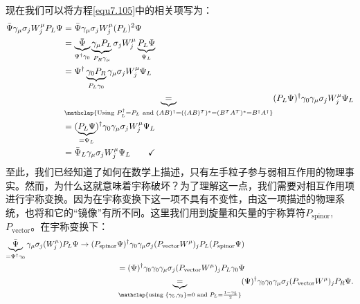 现在我们可以将方程\ref{equ7.105}中的相关项写为：
\begin{align}
\bar{\Psi}\gamma_\mu\sigma_j W_j^\mu P_L\Psi&=\bar{\Psi}\gamma_\mu\sigma_j W_j^\mu (P_L)^2\Psi\nonumber\\
&=\underbrace{\bar{\Psi}}_{\Psi^\dag\gamma_0}\underbrace{\gamma_\mu P_L}_{P_R\gamma_\mu}\sigma_j W_j^\mu \underbrace{P_L\Psi}_{\Psi_L}\nonumber\\
&=\Psi^\dag\underbrace{\gamma_0P_R}_{P_L\gamma_0}\gamma_\mu\sigma_j W_j^\mu \Psi_L\nonumber\\
&\underbrace{=}_{\mathclap{\text{Using }P_L^\dag=P_L\text{ and }(AB)^\dag=((AB)^T)^*=(B^TA^T)^*=B^\dag A^\dag}}(P_L\Psi)^\dag\gamma_0\gamma_\mu\sigma_j W_j^\mu \Psi_L\nonumber\\
&=(\underbrace{P_L\Psi}_{=\Psi_L})^\dag\gamma_0\gamma_\mu\sigma_j W_j^\mu \Psi_L\nonumber\\
&=\bar{\Psi}_L\gamma_\mu\sigma_j W_j^\mu \Psi_L\text{\hspace{7mm}\checkmark}
\label{equ7.108}
\end{align}
至此，我们已经知道了如何在数学上描述，只有左手粒子参与弱相互作用的物理事实。然而，为什么这就意味着宇称破坏？为了理解这一点，我们需要对相互作用项进行宇称变换。因为在宇称变换下这一项不具有不变性，由这一项描述的物理系统，也将和它的“镜像”有所不同。这里我们用到旋量和矢量的宇称算符$P_\text{spinor}$, $P_\text{vector}$。在宇称变换下：
\begin{align}
\underbrace{\bar{\Psi}}_{=\Psi^\dag\gamma_0}\gamma_\mu\sigma_j (W_j^\mu) P_L\Psi\rightarrow(P_\text{spinor}&\Psi)^\dag\gamma_0\gamma_\mu\sigma_j (P_\text{vector}W^\mu)_j P_L(P_\text{spinor}\Psi)\nonumber\\
&=(\Psi)^\dag\gamma_0\gamma_0\gamma_\mu\sigma_j (P_\text{vector}W^\mu)_j P_L\gamma_0\Psi\nonumber\\
&\underbrace{=}_{\mathclap{\text{using }\{\gamma_5,\gamma_0\}=0\text{ and }P_L=\frac{1-\gamma_5}{2}}}(\Psi)^\dag\gamma_0\gamma_0\gamma_\mu\sigma_j (P_\text{vector}W^\mu)_j P_R\Psi.
\label{equ7.109}
\end{align}
